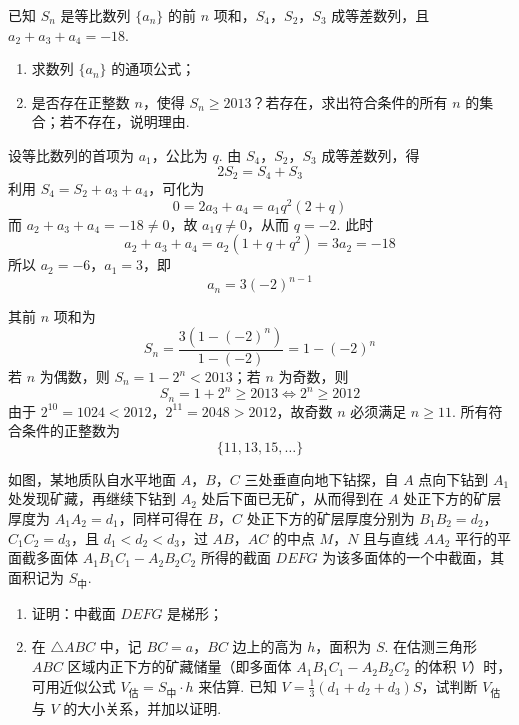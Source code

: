 \begin{problem}
已知 \(S_n\) 是等比数列 \(\{a_n\}\) 的前 \(n\) 项和，\(S_4\)，\(S_2\)，\(S_3\) 成等差数列，且 \(a_2+a_3+a_4=-18\).

\begin{enumerate}
\item 求数列 \(\{a_n\}\) 的通项公式；
\item 是否存在正整数 \(n\)，使得 \(S_n\geqslant 2013\)？若存在，求出符合条件的所有 \(n\) 的集合；若不存在，说明理由.
\end{enumerate}
\end{problem}

\begin{solution}
设等比数列的首项为 \(a_1\)，公比为 \(q\). 由 \(S_4\)，\(S_2\)，\(S_3\) 成等差数列，得
\[
 2S_2=S_4+S_3
\]
利用 \(S_4=S_2+a_3+a_4\)，可化为
\[
 0=2a_3+a_4=a_1q^2(2+q)
\]
而 \(a_2+a_3+a_4=-18\ne0\)，故 \(a_1q\ne0\)，从而 \(q=-2\). 此时
\[
 a_2+a_3+a_4=a_2(1+q+q^2)=3a_2=-18
\]
所以 \(a_2=-6\)，\(a_1=3\)，即
\[
 a_n=3(-2)^{n-1}
\]

其前 \(n\) 项和为
\[
 S_n=\frac{3(1-(-2)^n)}{1-(-2)}=1-(-2)^n
\]
若 \(n\) 为偶数，则 \(S_n=1-2^n<2013\)；若 \(n\) 为奇数，则
\[
 S_n=1+2^n\geqslant2013\iff 2^n\geqslant2012
\]
由于 \(2^{10}=1024<2012\)，\(2^{11}=2048>2012\)，故奇数 \(n\) 必须满足 \(n\geqslant11\). 所有符合条件的正整数为
\[
 \{11,13,15,\ldots\}
\]
\end{solution}

\begin{problem}
如图，某地质队自水平地面 \(A\)，\(B\)，\(C\) 三处垂直向地下钻探，自 \(A\) 点向下钻到 \(A_1\) 处发现矿藏，再继续下钻到 \(A_2\) 处后下面已无矿，从而得到在 \(A\) 处正下方的矿层厚度为 \(A_1A_2=d_1\)，同样可得在 \(B\)，\(C\) 处正下方的矿层厚度分别为 \(B_1B_2=d_2\)，\(C_1C_2=d_3\)，且 \(d_1<d_2<d_3\)，过 \(AB\)，\(AC\) 的中点 \(M\)，\(N\) 且与直线 \(AA_2\) 平行的平面截多面体 \(A_1B_1C_1-A_2B_2C_2\) 所得的截面 \(DEFG\) 为该多面体的一个中截面，其面积记为 \(S_{\text{中}}\).

\begin{enumerate}
\item 证明：中截面 \(DEFG\) 是梯形；
\item 在 \(\triangle ABC\) 中，记 \(BC=a\)，\(BC\) 边上的高为 \(h\)，面积为 \(S\). 在估测三角形 \(ABC\) 区域内正下方的矿藏储量（即多面体 \(A_1B_1C_1-A_2B_2C_2\) 的体积 \(V\)）时，可用近似公式 \(V_{\text{估}}=S_{\text{中}}\cdot h\) 来估算. 已知 \(V=\frac{1}{3}(d_1+d_2+d_3)S\)，试判断 \(V_{\text{估}}\) 与 \(V\) 的大小关系，并加以证明.
\end{enumerate}

\end{problem}

